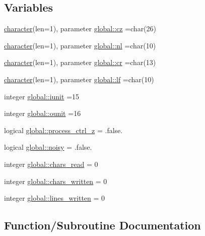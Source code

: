 \subsection*{Variables}
\begin{DoxyCompactItemize}
\item 
\hyperlink{option__stopwatch_83_8txt_abd4b21fbbd175834027b5224bfe97e66}{character}(len=1), parameter \hyperlink{namespaceglobal_ae55226f82ca7ee1f12eeb19f4619f98c}{global\+::cz} =char(26)
\item 
\hyperlink{option__stopwatch_83_8txt_abd4b21fbbd175834027b5224bfe97e66}{character}(len=1), parameter \hyperlink{namespaceglobal_a972f6c4dda60a65f2529b3fa30f61ad5}{global\+::nl} =char(10)
\item 
\hyperlink{option__stopwatch_83_8txt_abd4b21fbbd175834027b5224bfe97e66}{character}(len=1), parameter \hyperlink{namespaceglobal_a66654a3eb0e9c862da1f7ca5388b2e83}{global\+::cr} =char(13)
\item 
\hyperlink{option__stopwatch_83_8txt_abd4b21fbbd175834027b5224bfe97e66}{character}(len=1), parameter \hyperlink{namespaceglobal_a65a09148e3924472bdd8a5735476c7ed}{global\+::lf} =char(10)
\item 
integer \hyperlink{namespaceglobal_ad88d280367759e82acb4de429dce1caa}{global\+::iunit} =15
\item 
integer \hyperlink{namespaceglobal_a243230c67d07fa783b97362c247e777c}{global\+::ounit} =16
\item 
logical \hyperlink{namespaceglobal_ab06e1a0896cfbbc3a6516eedaba862e0}{global\+::process\+\_\+ctrl\+\_\+z} = .false.
\item 
logical \hyperlink{namespaceglobal_af2859727a2cdfcff37dacc9cadc1c046}{global\+::noisy} = .false.
\item 
integer \hyperlink{namespaceglobal_a2d038312d6b015cabfbb5716cb61baac}{global\+::chars\+\_\+read} = 0
\item 
integer \hyperlink{namespaceglobal_a22f0db93abbbbd8c37f50b829daa00ad}{global\+::chars\+\_\+written} = 0
\item 
integer \hyperlink{namespaceglobal_a85ce1360a8a9498bab52f97d527bee12}{global\+::lines\+\_\+written} = 0
\end{DoxyCompactItemize}


\subsection{Function/\+Subroutine Documentation}
\mbox{\label{dtu_8f90_a2106e8eae75b8f66312eadae9a00d01f}} 
